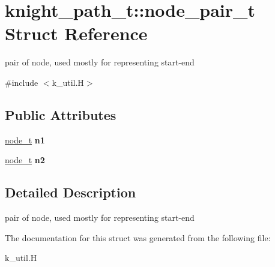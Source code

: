 \hypertarget{structknight__path__t_1_1node__pair__t}{\section{knight\-\_\-path\-\_\-t\-:\-:node\-\_\-pair\-\_\-t \-Struct \-Reference}
\label{structknight__path__t_1_1node__pair__t}
}


pair of node, used mostly for representing start-\/end  




{\ttfamily \#include $<$k\-\_\-util.\-H$>$}

\subsection*{\-Public \-Attributes}
\begin{DoxyCompactItemize}
\item 
\hypertarget{structknight__path__t_1_1node__pair__t_a533280c4bdc8b0b40013796f44723039}{\hyperlink{structknight__path__t_1_1node__t}{node\-\_\-t} {\bfseries n1}}\label{structknight__path__t_1_1node__pair__t_a533280c4bdc8b0b40013796f44723039}

\item 
\hypertarget{structknight__path__t_1_1node__pair__t_adc68eb73f0168f231b1012b1304a5793}{\hyperlink{structknight__path__t_1_1node__t}{node\-\_\-t} {\bfseries n2}}\label{structknight__path__t_1_1node__pair__t_adc68eb73f0168f231b1012b1304a5793}

\end{DoxyCompactItemize}


\subsection{\-Detailed \-Description}
pair of node, used mostly for representing start-\/end 

\-The documentation for this struct was generated from the following file\-:\begin{DoxyCompactItemize}
\item 
k\-\_\-util.\-H\end{DoxyCompactItemize}
